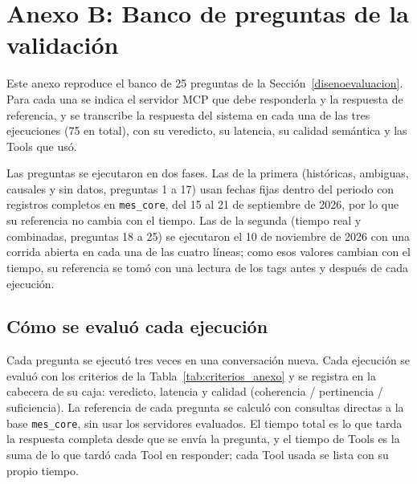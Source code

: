 \section*{Anexo B: Banco de preguntas de la validación}
{}
\makeatletter{}\makeatother
\label{anexo:banco_preguntas}

\begin{singlespace}
\setlength{\parskip}{0.5em}
Este anexo reproduce el banco de 25 preguntas de la Sección~\ref{disenoevaluacion}. Para cada una se indica el servidor MCP que debe responderla y la respuesta de referencia, y se transcribe la respuesta del sistema en cada una de las tres ejecuciones (75 en total), con su veredicto, su latencia, su calidad semántica y las Tools que usó.

Las preguntas se ejecutaron en dos fases. Las de la primera (históricas, ambiguas, causales y sin datos, preguntas 1 a 17) usan fechas fijas dentro del periodo con registros completos en \texttt{mes\_core}, del 15 al 21 de septiembre de 2026, por lo que su referencia no cambia con el tiempo. Las de la segunda (tiempo real y combinadas, preguntas 18 a 25) se ejecutaron el 10 de noviembre de 2026 con una corrida abierta en cada una de las cuatro líneas; como esos valores cambian con el tiempo, su referencia se tomó con una lectura de los tags antes y después de cada ejecución.

\subsection*{Cómo se evaluó cada ejecución}
Cada pregunta se ejecutó tres veces en una conversación nueva. Cada ejecución se evaluó con los criterios de la Tabla~\ref{tab:criterios_anexo} y se registra en la cabecera de su caja: veredicto, latencia y calidad (coherencia / pertinencia / suficiencia). La referencia de cada pregunta se calculó con consultas directas a la base \texttt{mes\_core}, sin usar los servidores evaluados. El tiempo total es lo que tarda la respuesta completa desde que se envía la pregunta, y el tiempo de Tools es la suma de lo que tardó cada Tool en responder; cada Tool usada se lista con su propio tiempo.


\end{singlespace}
